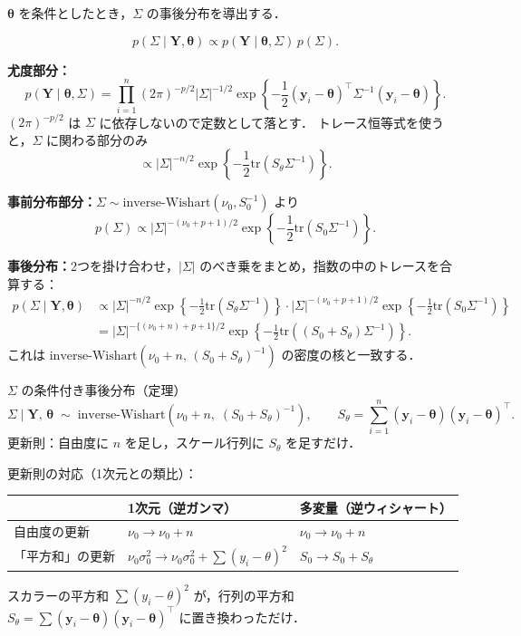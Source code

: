 \documentclass[lualatex,ja=standard,a4paper,12pt]{bxjsarticle}
\newcommand{\IW}{\mathrm{inverse\text{-}Wishart}}
\newcommand{\tr}{\mathrm{tr}}
\begin{document}
$\bm{\theta}$ を条件としたとき，$\Sigma$ の事後分布を導出する．

\[
  p(\Sigma \mid \bm{Y}, \bm{\theta})
  \propto p(\bm{Y} \mid \bm{\theta}, \Sigma)\, p(\Sigma).
\]

\textbf{尤度部分：}
\[
  p(\bm{Y} \mid \bm{\theta}, \Sigma)
  = \prod_{i=1}^n (2\pi)^{-p/2}|\Sigma|^{-1/2}
    \exp\!\left\{-\frac{1}{2}(\bm{y}_i - \bm{\theta})^\top\Sigma^{-1}(\bm{y}_i-\bm{\theta})\right\}.
\]
$(2\pi)^{-p/2}$ は $\Sigma$ に依存しないので定数として落とす．
トレース恒等式を使うと，$\Sigma$ に関わる部分のみ
\[
  \propto |\Sigma|^{-n/2} \exp\!\left\{-\frac{1}{2}\tr(S_\theta \Sigma^{-1})\right\}.
\]

\textbf{事前分布部分：}$\Sigma \sim \IW(\nu_0, S_0^{-1})$ より
\[
  p(\Sigma) \propto |\Sigma|^{-(\nu_0+p+1)/2} \exp\!\left\{-\frac{1}{2}\tr(S_0\Sigma^{-1})\right\}.
\]

\textbf{事後分布：}2つを掛け合わせ，$|\Sigma|$ のべき乗をまとめ，指数の中のトレースを合算する：
\begin{align*}
  p(\Sigma \mid \bm{Y}, \bm{\theta})
  &\propto |\Sigma|^{-n/2} \exp\!\left\{-\frac12\tr(S_\theta\Sigma^{-1})\right\}
  \cdot |\Sigma|^{-(\nu_0+p+1)/2} \exp\!\left\{-\frac12\tr(S_0\Sigma^{-1})\right\} \\
  &= |\Sigma|^{-\{(\nu_0+n)+p+1\}/2}
  \exp\!\left\{-\frac12\tr\!\left((S_0+S_\theta)\Sigma^{-1}\right)\right\}.
\end{align*}
これは $\IW(\nu_0 + n,\, (S_0 + S_\theta)^{-1})$ の密度の核と一致する．

\begin{thmbox}{$\Sigma$ の条件付き事後分布（定理）}
\[
  \Sigma \mid \bm{Y},\, \bm{\theta} \;\sim\; \IW\!\left(\nu_0 + n,\; \left(S_0 + S_\theta\right)^{-1}\right),
  \qquad
  S_\theta = \sum_{i=1}^n (\bm{y}_i - \bm{\theta})(\bm{y}_i - \bm{\theta})^\top.
\]
更新則：自由度に $n$ を足し，スケール行列に $S_\theta$ を足すだけ．
\end{thmbox}

\begin{pointbox}
更新則の対応（1次元との類比）：
\begin{center}
\renewcommand{\arraystretch}{1.4}
\begin{tabular}{lll}
\toprule
 & 1次元（逆ガンマ） & 多変量（逆ウィシャート） \\
\midrule
自由度の更新 & $\nu_0 \to \nu_0 + n$ & $\nu_0 \to \nu_0 + n$ \\
「平方和」の更新 & $\nu_0\sigma_0^2 \to \nu_0\sigma_0^2 + \sum(y_i-\theta)^2$ & $S_0 \to S_0 + S_\theta$ \\
\bottomrule
\end{tabular}
\end{center}
スカラーの平方和 $\sum(y_i-\theta)^2$ が，行列の平方和 $S_\theta = \sum(\bm{y}_i-\bm{\theta})(\bm{y}_i-\bm{\theta})^\top$ に置き換わっただけ．
\end{pointbox}
\end{document}
